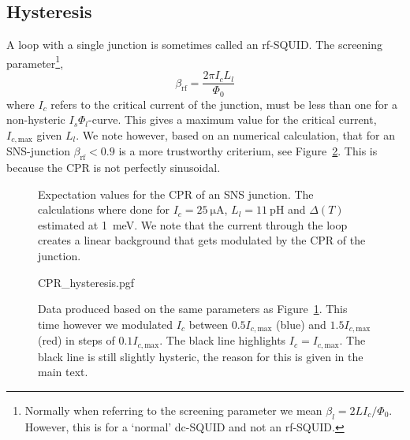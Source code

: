 \subsection{Hysteresis}
A loop with a single junction is sometimes called an rf-SQUID\cite{clarkeSQUIDHandbook2004}. The screening parameter\footnote{Normally when referring to the screening parameter we mean $\beta_l = 2LI_c/\Phi_0$. However, this is for a `normal' dc-SQUID and not an rf-SQUID.},
\begin{equation}
	\beta_{\text{rf}} = \frac{2\pi I_c L_l}{\Phi_0}
\end{equation}
where $I_c$ refers to the critical current of the junction, must be less than one for a non-hysteric $I_s\Phi_l$-curve\cite{clarkeSQUIDHandbook2004,frolovMeasurementCurrentPhaseRelation2004}. This gives a maximum value for the critical current, $I_{c,\text{max}}$ given $L_l$. We note however, based on an numerical calculation, that for an SNS-junction $\beta_{\text{rf}} < 0.9$ is a more trustworthy criterium, see Figure~\ref{fig:CPR-hysteresis}. This is because the CPR is not perfectly sinusoidal\cite{vermeerSTMbasedScanningSQUID2021,likharevSuperconductingWeakLinks1979}.

\begin{figure}[h]
	\begin{subfigure}[t]{0.45\textwidth}
		\centering
		
	\end{subfigure}
	\hfill
	\begin{subfigure}[t]{0.45\textwidth}
		\centering
		
	\end{subfigure}

	\caption{Expectation values for the CPR of an SNS junction. The calculations where done for $I_c=\qty{25}{\micro\ampere}$, $L_l=\qty{11}{\pico\henry}$ and $\Delta(T)$ estimated at \qty{1}{\milli\electronvolt}. We note that the current through the loop creates a linear background that gets modulated by the CPR of the junction.}
	\label{fig:analytical-prediction}
\end{figure}

\begin{figure}
	\centering
	{CPR_hysteresis.pgf}
	\caption{Data produced based on the same parameters as Figure~\ref{fig:analytical-prediction}. This time however we modulated $I_c$ between $0.5I_{c,\text{max}}$ (blue) and $1.5I_{c,\text{max}}$ (red) in steps of $0.1I_{c,\text{max}}$. The black line highlights $I_c=I_{c,\text{max}}$. The black line is still slightly hysteric, the reason for this is given in the main text.}
	\label{fig:CPR-hysteresis}
\end{figure}